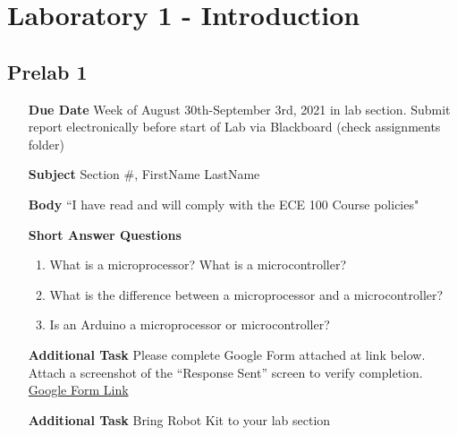 \chapter{Laboratory 1 - Introduction}
\section{Prelab 1}

\begin{itemize}
	\item[\textbf{Due Date}]{Week of August 30th-September 3rd, 2021 in lab section. Submit report electronically before start of Lab via Blackboard (check assignments folder)}
	\item[\textbf{Subject}]{Section \#, FirstName LastName}
	\item[\textbf{Body}]{``I have read and will comply with the ECE 100 Course policies"}
	\item[\textbf{Short Answer Questions}]{
		\begin{enumerate}
			\item{What is a microprocessor? What is a microcontroller?}
			\item{What is the difference between a microprocessor and a microcontroller?}
			\item{Is an Arduino a microprocessor or microcontroller?}
		\end{enumerate}
	}
	\item[\textbf{Additional Task}]{Please complete Google Form attached at link below. Attach a screenshot of the “Response Sent” screen to verify completion. \href{https://docs.google.com/forms/d/1YDT2DtzWYms2BeuS1Wrks3ZANfYgNUmNhEl2PUm63Qc/prefill}{Google Form Link}}
	\item[\textbf{Additional Task}]{Bring Robot Kit to your lab section}
\end{itemize}
